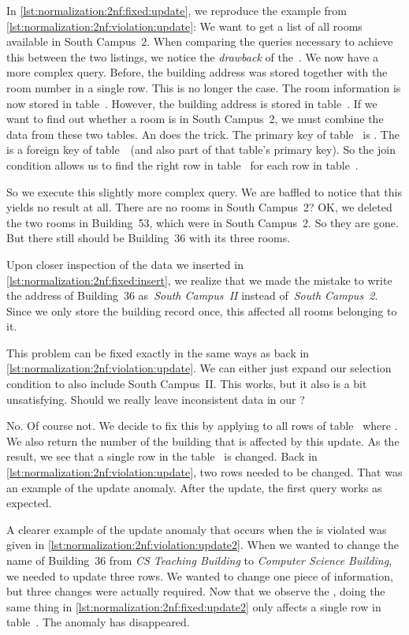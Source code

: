 In \cref{lst:normalization:2nf:fixed:update}, we reproduce the example from \cref{lst:normalization:2nf:violation:update}:
We want to get a list of all rooms available in South Campus~2.
When comparing the queries necessary to achieve this between the two listings, we notice the \emph{drawback} of the~.
We now have a more complex query.
Before, the building address was stored together with the room number in a single row.
This is no longer the case.
The room information is now stored in table~.
However, the building address is stored in table~.
If we want to find out whether a room is in South Campus~2, we must combine the data from these two tables.
An  does the trick.
The primary key of table~ is .
The  is a foreign key of table~~(and also part of that table's primary key).
So the join condition  allows us to find the right row in table~ for each row in table~.

So we execute this slightly more complex query.
We are baffled to notice that this yields no result at all.
There are no rooms in South Campus~2?
OK, we deleted the two rooms in Building~53, which were in South Campus~2.
So they are gone.
But there still should be Building~36 with its three rooms.

Upon closer inspection of the data we inserted in \cref{lst:normalization:2nf:fixed:insert}, we realize that we made the mistake to write the address of Building~36 as~\emph{South Campus~II} instead of~\emph{South Campus~2}.
Since we only store the building record once, this affected all rooms belonging to it.

This problem can be fixed exactly in the same ways as back in \cref{lst:normalization:2nf:violation:update}.
We can either just expand our selection condition to also include South Campus~II.
This works, but it also is a bit unsatisfying.
Should we really leave inconsistent data in our \db?

No.
Of course not.
We decide to fix this by applying  to all rows of table~ where .
We also return the number of the building that is affected by this update.
As the result, we see that a single row in the table~ is changed.
Back in \cref{lst:normalization:2nf:violation:update}, two rows needed to be changed.
That was an example of the update anomaly.
After the update, the first query works as expected.

A clearer example of the update anomaly that occurs when the  is violated was given in \cref{lst:normalization:2nf:violation:update2}.
When we wanted to change the name of Building~36 from \emph{CS Teaching Building} to \emph{Computer Science Building}, we needed to update three rows.
We wanted to change one piece of information, but three changes were actually required.
Now that we observe the , doing the same thing in \cref{lst:normalization:2nf:fixed:update2} only affects a single row in table~.
The anomaly has disappeared.%
%
\FloatBarrier%
\endhsection%
%
